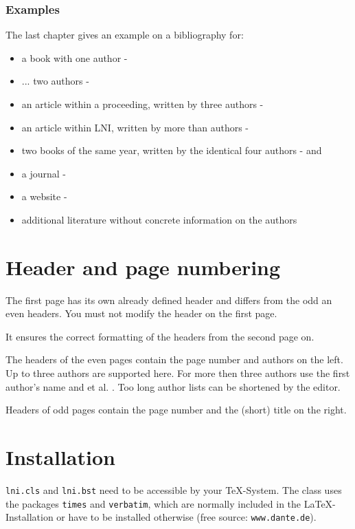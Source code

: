 \documentclass[english]{lni}
\begin{document}
\subsubsection{Examples}
The last chapter gives an example on a bibliography for:
\begin{itemize}
	\item a book with one author - \cite{Ez10}
	\item ... two authors - \cite{AB00}
	\item an article within a proceeding, written by three authors - \cite{ABC01}
	\item an article within LNI, written by more than authors - \cite{Az09}
	\item two books of the same year, written by the identical four authors - \cite{Wa14} and \cite{Wa14b}
	\item a journal - \cite{Gl06}
	\item a website - \cite{GI14}
	\item additional literature without concrete information on the authors \cite{XX14}
\end{itemize}

\section{Header and page numbering}
The first page has its own already defined header and differs from the odd an even headers. You must not modify the header on the first page.

It ensures the correct formatting of the headers from the second page on.

The headers of the even pages contain the page number and authors on the left. Up to three authors are supported here. For more then three authors use the first author's name and et al. .
Too long author lists can be shortened by the editor.

Headers of odd pages contain the page number and the (short) title on the right.

\section{Installation}

\texttt{lni.cls} and \texttt{lni.bst} need to be accessible by your \TeX-System. The class uses the packages \texttt{times} and \texttt{verbatim}, which are normally included in the \LaTeX-Installation or have to be installed otherwise (free source: \texttt{www.dante.de}).



\end{document}
